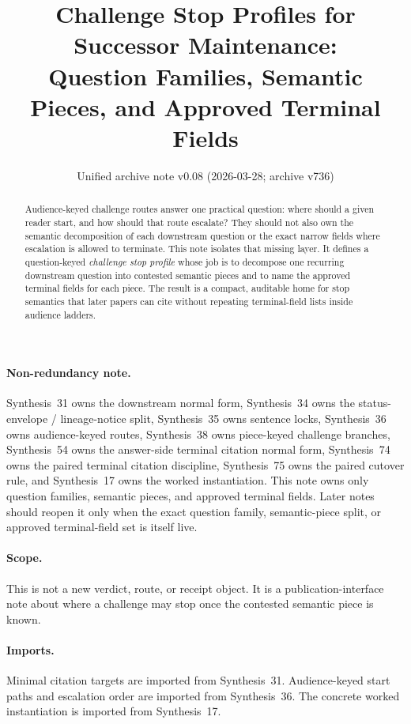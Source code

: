 \documentclass[11pt]{article}
\title{Challenge Stop Profiles for Successor Maintenance:\\[0.5ex]
\large Question Families, Semantic Pieces, and Approved Terminal Fields}
\author{}
\date{Unified archive note v0.08 (2026-03-28; archive v736)}
\begin{document}
\maketitle

\begin{abstract}
Audience-keyed challenge routes answer one practical question: where should a given reader start, and how should that route escalate?
They should not also own the semantic decomposition of each downstream question or the exact narrow fields where escalation is allowed to terminate.
This note isolates that missing layer.
It defines a question-keyed \emph{challenge stop profile} whose job is to decompose one recurring downstream question into contested semantic pieces and to name the approved terminal fields for each piece.
The result is a compact, auditable home for stop semantics that later papers can cite without repeating terminal-field lists inside audience ladders.
\end{abstract}

\paragraph{Non-redundancy note.}
Synthesis~31 owns the downstream normal form, Synthesis~34 owns the status-envelope / lineage-notice split, Synthesis~35 owns sentence locks, Synthesis~36 owns audience-keyed routes, Synthesis~38 owns piece-keyed challenge branches, Synthesis~54 owns the answer-side terminal citation normal form, Synthesis~74 owns the paired terminal citation discipline, Synthesis~75 owns the paired cutover rule, and Synthesis~17 owns the worked instantiation. This note owns only question families, semantic pieces, and approved terminal fields. Later notes should reopen it only when the exact question family, semantic-piece split, or approved terminal-field set is itself live.

\paragraph{Scope.}
This is not a new verdict, route, or receipt object. It is a publication-interface note about where a challenge may stop once the contested semantic piece is known.

\paragraph{Imports.}
Minimal citation targets are imported from Synthesis~31.\cite{series:downstreamnormalforms}
Audience-keyed start paths and escalation order are imported from Synthesis~36.\cite{series:challengeroutes}
The concrete worked instantiation is imported from Synthesis~17.\cite{series:workedexample}
\end{document}

